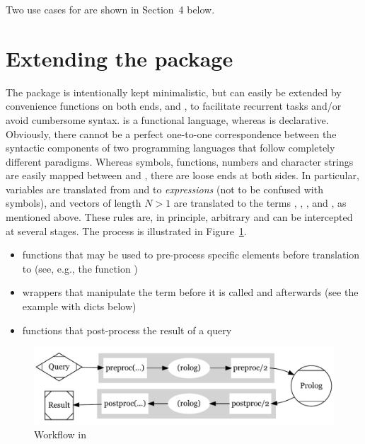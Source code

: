 \documentclass[article]{jss}
\begin{document}
Two use cases for  are shown in Section\ 4 below.

\section{Extending the package}
\label{sec:extending}

The package is intentionally kept minimalistic, but can easily be extended by
convenience functions on both ends,  and , to
facilitate recurrent tasks and/or avoid cumbersome syntax.  is a
functional language, whereas  is declarative. Obviously, there
cannot be a perfect one-to-one correspondence between the syntactic components
of two programming languages that follow completely different paradigms. Whereas
symbols, functions, numbers and character strings are easily mapped 
between  and , there are loose ends at both sides.
In particular,  variables are translated from and 
to  \emph{expressions} (not to be confused with 
symbols), and  vectors of length $N > 1$ are translated to
the  terms , , , 
and , as mentioned above. These rules are, in principle, arbitrary
and can be intercepted at several stages. The process is illustrated 
in Figure~\ref{fig:workflow}. 

\begin{itemize}
\item {} functions that may be used to pre-process 
  specific  elements before translation
  to  (see, e.g., the  function )
\item {} wrappers that manipulate the term before it is called
  and afterwards (see the example with dicts below)
\item {} functions that post-process the result of a query
\end{itemize}

\begin{figure}[b]
\centering
\includegraphics[width=0.8\columnwidth]{workflow}
\caption[Workflow in rolog]{Workflow in }
\label{fig:workflow}
\end{figure}
\end{document}
